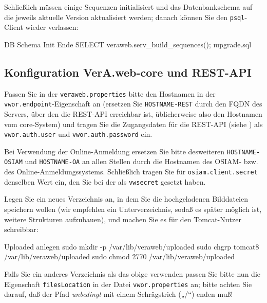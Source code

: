 \documentclass{tarentanleitung}
\begin{document}
\begin{minipage}{\linewidth}
Schließlich müssen einige Sequenzen initialisiert und das Datenbankschema
auf die jeweils aktuelle Version aktualisiert werden; danach können Sie
den \texttt{psql}-Client wieder verlassen:

\begin{lstdump}{DB Schema Init Ende}
SELECT veraweb.serv_build_sequences();
\i upgrade.sql
\q
\end{lstdump}
\end{minipage}

\subsection{Konfiguration VerA.web-core und REST-API}\label{subsec:setup-core-files}

Passen Sie in der \texttt{veraweb.properties} bitte den Hostnamen
in der \texttt{vwor.endpoint}-Eigenschaft an (ersetzen Sie
\texttt{HOSTNAME-REST} durch den FQDN des Servers, über den die
REST-API erreichbar ist, üblicherweise also den Hostnamen vom
core-System) und tragen Sie die Zugangsdaten für die REST-API
(siehe ) als \texttt{vwor.auth.user}
und \texttt{vwor.auth.password} ein.

Bei Verwendung der Online-Anmeldung ersetzen Sie bitte desweiteren
\texttt{HOSTNAME-OSIAM} und \texttt{HOSTNAME-OA} an allen Stellen
durch die Hostnamen des OSIAM- bzw. des Online-Anmeldungssystems.
Schließlich tragen Sie für \texttt{osiam.client.secret} denselben
Wert ein, den Sie bei der 
als \texttt{vwsecret} gesetzt haben.

\begin{minipage}{\linewidth}
Legen Sie ein neues Verzeichnis an, in dem Sie die hochgeladenen
Bilddateien speichern wollen (wir empfehlen ein Unterverzeichnis,
sodaß es später möglich ist, weitere Strukturen aufzubauen), und
machen Sie es für den Tomcat-Nutzer schreibbar:

\begin{lstdump}{Uploaded anlegen}
sudo mkdir -p /var/lib/veraweb/uploaded
sudo chgrp tomcat8 /var/lib/veraweb/uploaded
sudo chmod 2770 /var/lib/veraweb/uploaded
\end{lstdump}

Falls Sie ein anderes Verzeichnis als das obige verwenden passen
Sie bitte nun die Eigenschaft \texttt{filesLocation} in der Datei
\texttt{vwor.properties} an; bitte achten Sie darauf, daß der
Pfad \emph{unbedingt} mit einem Schrägstrich („/“) enden muß!
\end{minipage}
\end{document}
